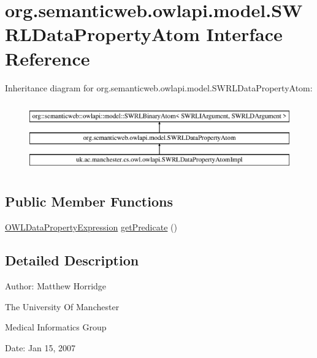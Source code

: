 \hypertarget{interfaceorg_1_1semanticweb_1_1owlapi_1_1model_1_1_s_w_r_l_data_property_atom}{\section{org.\-semanticweb.\-owlapi.\-model.\-S\-W\-R\-L\-Data\-Property\-Atom Interface Reference}
\label{interfaceorg_1_1semanticweb_1_1owlapi_1_1model_1_1_s_w_r_l_data_property_atom}
}
Inheritance diagram for org.\-semanticweb.\-owlapi.\-model.\-S\-W\-R\-L\-Data\-Property\-Atom\-:\begin{figure}[H]
\begin{center}
\leavevmode
\includegraphics[height=3.000000cm]{interfaceorg_1_1semanticweb_1_1owlapi_1_1model_1_1_s_w_r_l_data_property_atom}
\end{center}
\end{figure}
\subsection*{Public Member Functions}
\begin{DoxyCompactItemize}
\item 
\hyperlink{interfaceorg_1_1semanticweb_1_1owlapi_1_1model_1_1_o_w_l_data_property_expression}{O\-W\-L\-Data\-Property\-Expression} \hyperlink{interfaceorg_1_1semanticweb_1_1owlapi_1_1model_1_1_s_w_r_l_data_property_atom_acd7794f6e36a95c9f6da8cbdb6529465}{get\-Predicate} ()
\end{DoxyCompactItemize}


\subsection{Detailed Description}
Author\-: Matthew Horridge\par
 The University Of Manchester\par
 Medical Informatics Group\par
 Date\-: Jan 15, 2007\par
\par
 

